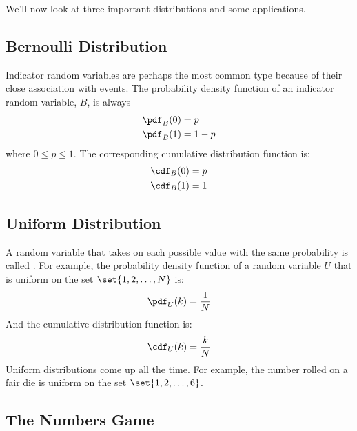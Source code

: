We'll now look at three important distributions and some applications.

\subsection{Bernoulli Distribution}

 Indicator random variables are perhaps the most
common type because of their close association with events.  The
probability density function of an indicator random variable, $B$, is
always
%
\begin{align*}
\pdf_B(0) & = p \\
\pdf_B(1) & = 1 - p \\
\end{align*}
%
where $0 \leq p \leq 1$.  The corresponding cumulative distribution
function is:
%
\begin{align*}
\cdf_B(0) & = p \\
\cdf_B(1) & = 1
\end{align*}
%

\subsection{Uniform Distribution}

A random variable that takes on each possible value with the same
probability is called .  For example, the probability
density function of a random variable $U$ that is uniform on the set
$\set{1, 2, \dots, N}$ is:
%
\begin{align*}
\pdf_U(k) = \frac{1}{N}
\end{align*}
%
And the cumulative distribution function is:
%
\begin{align*}
\cdf_U(k) = \frac{k}{N}
\end{align*}
%
Uniform distributions come up all the time.  For example, the number
rolled on a fair die is uniform on the set $\set{1, 2, \dots, 6}$.

\subsection{The Numbers Game}\label{bigger_number_subsec}

